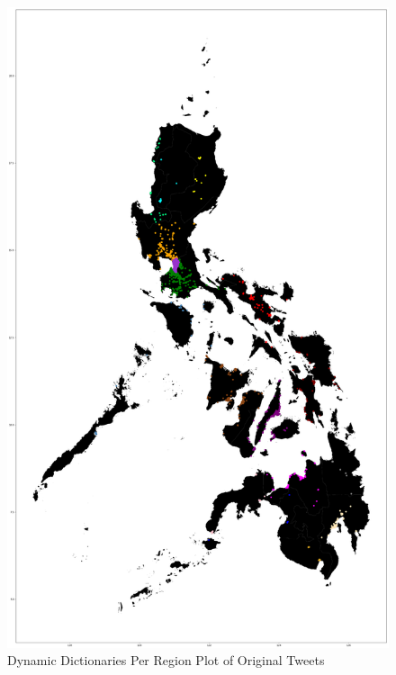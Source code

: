 \begin{figure}
    \centering
    \includegraphics[width=\textwidth, height=\textheight,keepaspectratio]{Method2OrigMap.png}
    \caption{Dynamic Dictionaries Per Region Plot of Original Tweets}
    \label{fig:my_label7}
\end{figure}

